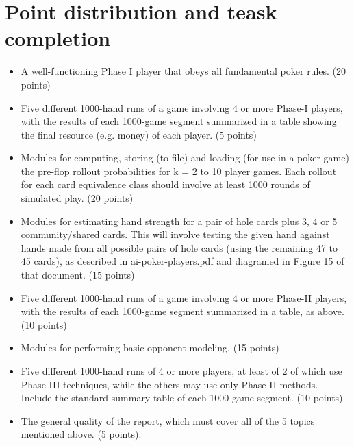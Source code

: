 \documentclass[titlepage]{article}
\begin{document}
\section{Point distribution and teask completion}
	\begin{itemize}
		\item A well-functioning Phase I player that obeys all fundamental poker rules. (20 points)

		\item Five different 1000-hand runs of a game involving 4 or more Phase-I players, with the results of each 1000-game segment summarized in a table showing the final resource 			(e.g. money) of each player. (5 points)

		\item Modules for computing, storing (to file) and loading (for use in a poker game) 	the pre-flop rollout probabilities for k = 2 to 10 player games. Each rollout for each 			card equivalence class should involve at least 1000 rounds of simulated play. (20 points)

		\item Modules for estimating hand strength for a pair of hole cards plus 3, 4 or 5 	community/shared cards. This will involve testing the given hand against hands made from all possible pairs of hole cards (using the remaining 47 to 45 cards), as described in ai-poker-players.pdf and diagramed in Figure 15 of that document. (15 points)

		\item Five different 1000-hand runs of a game involving 4 or more Phase-II players, with the results of each 1000-game segment summarized in a table, as above. (10 points)

		\item Modules for performing basic opponent modeling. (15 points)

		\item Five different 1000-hand runs of 4 or more players, at least of 2 of which use 	Phase-III techniques, while the others may use only Phase-II methods. Include the standard summary table of each 1000-game segment. (10 points)

		\item The general quality of the report, which must cover all of the 5 topics mentioned above. (5 points).
	\end{itemize}
\end{document}
